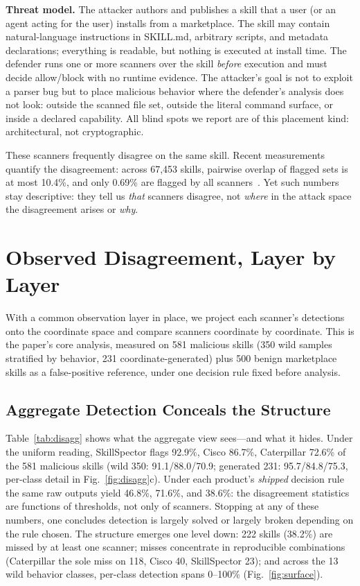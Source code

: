 \documentclass[sigconf,nonacm]{acmart}
\begin{document}
\textbf{Threat model.} The attacker authors and publishes a skill that a user (or an agent acting for the user) installs from a marketplace. The skill may contain natural-language instructions in SKILL.md, arbitrary scripts, and metadata declarations; everything is readable, but nothing is executed at install time. The defender runs one or more scanners over the skill \emph{before} execution and must decide allow/block with no runtime evidence. The attacker's goal is not to exploit a parser bug but to place malicious behavior where the defender's analysis does not look: outside the scanned file set, outside the literal command surface, or inside a declared capability. All blind spots we report are of this placement kind: architectural, not cryptographic.

These scanners frequently disagree on the same skill. Recent measurements quantify the disagreement: across 67{,}453 skills, pairwise overlap of flagged sets is at most 10.4\%, and only 0.69\% are flagged by all scanners~\cite{clawhub2026}. Yet such numbers stay descriptive: they tell us \emph{that} scanners disagree, not \emph{where} in the attack space the disagreement arises or \emph{why}.

\section{Observed Disagreement, Layer by Layer}
\label{sec:explain}

With a common observation layer in place, we project each scanner's detections onto the coordinate space and compare scanners coordinate by coordinate. This is the paper's core analysis, measured on 581 malicious skills (350 wild samples stratified by behavior, 231 coordinate-generated) plus 500 benign marketplace skills as a false-positive reference, under one decision rule fixed before analysis.

\subsection{Aggregate Detection Conceals the Structure}
Table~\ref{tab:disagg} shows what the aggregate view sees---and what it hides. Under the uniform reading, SkillSpector flags 92.9\%, Cisco 86.7\%, Caterpillar 72.6\% of the 581 malicious skills (wild 350: 91.1/88.0/70.9; generated 231: 95.7/84.8/75.3, per-class detail in Fig.~\ref{fig:disagg}c). Under each product's \emph{shipped} decision rule the same raw outputs yield 46.8\%, 71.6\%, and 38.6\%: the disagreement statistics are functions of thresholds, not only of scanners. Stopping at any of these numbers, one concludes detection is largely solved or largely broken depending on the rule chosen. The structure emerges one level down: 222 skills (38.2\%) are missed by at least one scanner; misses concentrate in reproducible combinations (Caterpillar the sole miss on 118, Cisco 40, SkillSpector 23); and across the 13 wild behavior classes, per-class detection spans 0--100\% (Fig.~\ref{fig:surface}).
\end{document}
